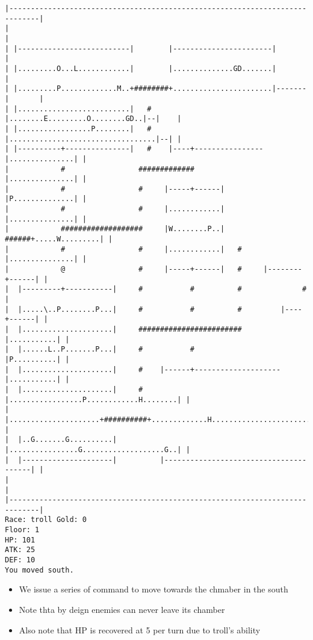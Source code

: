 \documentclass[11pt]{article}
\theoremstyle{plain}
\begin{document}
\begin{Verbatim}[fontsize=\scriptsize]
|-----------------------------------------------------------------------------|
|                                                                             |
| |--------------------------|        |-----------------------|               |
| |.........O...L............|        |..............GD.......|               |
| |.........P.............M..+########+.......................|-------|       |
| |..........................|   #    |........E.........O........GD..|--|    |
| |.................P........|   #    |..................................|--| |
| |----------+---------------|   #    |----+----------------|...............| |
|            #                 #############                |...............| |
|            #                 #     |-----+------|         |P..............| |
|            #                 #     |............|         |...............| |
|            ###################     |W........P..|   ######+.....W.........| |
|            #                 #     |............|   #     |...............| |
|            @                 #     |-----+------|   #     |--------+------| |
|  |---------+-----------|     #           #          #              #        |
|  |.....\..P........P...|     #           #          #         |----+------| |
|  |.....................|     ########################         |...........| |
|  |......L..P.......P...|     #           #                    |P..........| |
|  |.....................|     #    |------+--------------------|...........| |
|  |.....................|     #    |.................P............H........| |
|  |.....................+##########+.............H.........................| |
|  |..G.......G..........|          |................G...................G..| |
|  |---------------------|          |---------------------------------------| |
|                                                                             |
|-----------------------------------------------------------------------------|
Race: troll Gold: 0                                                    Floor: 1
HP: 101
ATK: 25
DEF: 10
You moved south.  
\end{Verbatim}

\begin{itemize}
    \item We issue a series of command to move towards the chmaber in the south
    \item Note thta by deign enemies can never leave its chamber
    \item Also note that HP is recovered at 5 per turn due to troll's ability
\end{itemize}
\end{document}
